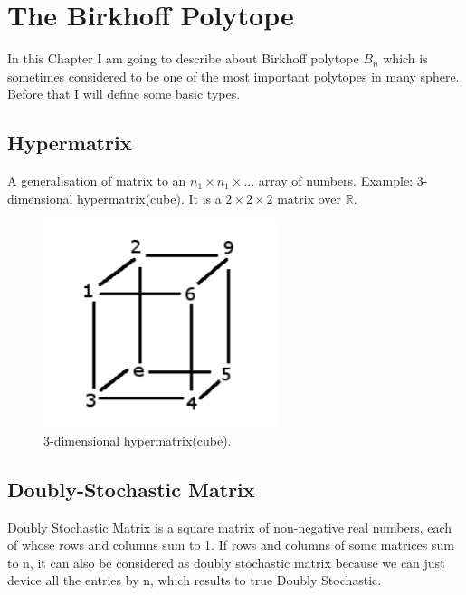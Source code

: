 
\chapter{The Birkhoff Polytope} %

\label{chptr:birkhoff_polytope} %



In this Chapter I am going to describe about Birkhoff polytope $B_n$ which is sometimes considered to be one of the most important polytopes in many sphere. Before that I will define some basic types.
\section{Hypermatrix}

A generalisation of matrix to an $n_1 \times n_1 \times ...$ array of numbers. \newline
Example: 3-dimensional hypermatrix(cube). It is a $2 \times 2 \times 2$ matrix over $\mathbb{R}$.


\begin{figure}[h]
\centering
\includegraphics{Figures/hypercube.png}
\decoRule
\caption[hypercube]{3-dimensional hypermatrix(cube).}
\label{fig:hypercube}
\end{figure}

\section{Doubly-Stochastic Matrix}

Doubly Stochastic Matrix is a square matrix of non-negative real numbers, each of whose rows and columns sum to 1. If rows and columns of some matrices sum to n, it can also be considered as doubly stochastic matrix because we can just device all the entries by n, which results to true Doubly Stochastic.\\


